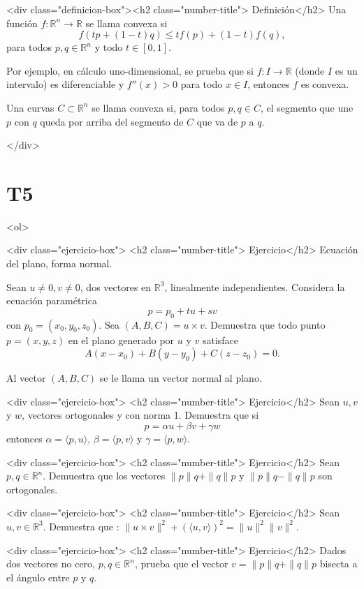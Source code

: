 \documentclass{article}
\theoremstyle{definition}
\begin{document}
  

	<div class="definicion-box"><h2 class="number-title">  Definición</h2>
	Una función $f: \mathbb{R}^n \to \mathbb{R}$ se llama convexa si 
	$$f( tp+(1-t)q ) \leq  tf(p)+(1-t)f(q),$$ 
	para todos $p,q \in \mathbb{R}^n$ y todo $t \in [0,1]$. 
	
	Por ejemplo, en cálculo uno-dimensional, se prueba que si $f: I \to \mathbb{R}$ (donde $I$ es un intervalo)
	es diferenciable y $f''(x)>0$ para todo $x\in I$, entonces $f$ es convexa.
	
	Una curvas $C\subset \mathbb{R}^n$ se llama convexa si, para todos $p,q\in C$, el segmento que une
	$p$ con $q$ queda por arriba del segmento de  $C$ que va de $p$ a $q$.
	
	</div>


        \section*{T5}
  
  <ol>

<div class="ejercicio-box"> <h2 class="number-title"> Ejercicio</h2> Ecuación del plano, forma normal. 

Sean $u\ne 0, v\ne 0$, dos vectores en $\mathbb{R}^3$, linealmente independientes. Considera la ecuación 
paramétrica
$$
p=p_0+tu+sv
$$	
con $p_0=(x_0,y_0,z_0)$. Sea $(A,B,C)=u\times v$. Demuestra que todo punto $p=(x,y,z)$ en el plano
generado por $u$ y $v$ satisface
$$
A(x-x_0)+B(y-y_0)+C(z-z_0)=0.
$$

Al vector $(A,B,C)$ se le llama un  vector normal al plano.


<div class="ejercicio-box"> <h2 class="number-title"> Ejercicio</h2> Sean $u,v$ y $w$, vectores ortogonales y con norma 1. Demuestra que si
  $$
  p=\alpha u + \beta v + \gamma w
  $$
  entonces $\alpha = \langle p, u \rangle$, $\beta=\langle p, v \rangle$ y $\gamma= \langle p, w \rangle$.
  
    <div class="ejercicio-box"> <h2 class="number-title"> Ejercicio</h2> Sean $p,q\in \mathbb{R}^n$. Demuestra que los vectores $\|p\|q+\|q\|p$ y $\|p\|q-\|q\|p$ son ortogonales.
 

      <div class="ejercicio-box"> <h2 class="number-title"> Ejercicio</h2> Sean $u,v\in \mathbb{R}^3$. Demuestra que : $\|u\times v \|^2+ (\langle u,v \rangle)^2=\|u\|^2\|v\|^2$.

    <div class="ejercicio-box"> <h2 class="number-title"> Ejercicio</h2> Dados dos vectores no cero, $p,q\in \mathbb{R}^n$, prueba que el vector $v=\|p\|q+\|q\|p$ bisecta a el
    ángulo entre $p$ y $q$.
    
\end{document}
